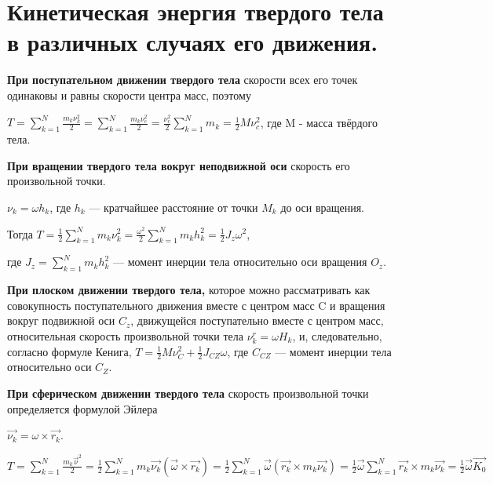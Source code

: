 {\section{Кинетическая энергия твердого тела в различных случаях его движения.}
\begin{center}
    \par \textbf{При поступательном движении твердого тела} скорости всех его точек одинаковы и равны скорости центра масс, поэтому 
    
    \par $T=\sum_{k=1}^{N}\frac{m_{k}\nu_{k}^{2}}{2} = \sum_{k=1}^{N}\frac{m_{k}\nu_{c}^{2}}{2} = \frac{\nu_{c}^{2}}{2}\sum_{k=1}^{N}m_{k} = \frac{1}{2}M\nu_{c}^{2}$, где M - масса твёрдого тела.
    
    \par \textbf {При  вращении  твердого  тела  вокруг  неподвижной  оси} скорость его произвольной точки. 
    
    \par $ \nu_{k} = \omega h_{k}$, где $ {h_{k}} $ — кратчайшее расстояние от точки $ {M_{k}} $ до оси вращения.
    
    \par Тогда $ T= \frac{1}{2}\sum_{k=1}^{N}{m_{k}\nu_{k}^{2}}= \frac{\omega^{2}}{2}\sum_{k=1}^{N}m_{k}h_{k}^{2} = \frac{1}{2}J_{z}\omega^{2} $, 
    \par где $J_{z} = \sum_{k=1}^{N}m_{k}h_{k}^{2}$ — момент инерции тела относительно оси вращения ${O_{z}}$.
   
    \par \textbf{При плоском движении твердого тела,} которое можно рассматривать как совокупность поступательного движения вместе с центром масс C и вращения  вокруг  подвижной  оси  ${C_{z}}$,  движущейся  поступательно  вместе  с центром масс, относительная скорость произвольной точки тела ${ \nu_{k}^{r} = \omega H_{k}}$, и, следовательно, согласно формуле Кенига,
    $T = \frac{1}{2}M\nu_{C}^{2} + \frac{1}{2}J_{CZ}\omega$, где ${C_{CZ}}$ — момент инерции тела относительно оси ${C_{Z}}$.

    \par \textbf {При сферическом движении твердого тела} скорость произвольной точки определяется формулой Эйлера
    \par $ \vec{\nu_{k}} = \omega \times\vec{r_{k}}. $
    
    \par $ T= \sum_{k=1}^{N} \frac{m_{k} \vec{\nu}^{2}}{2} = \frac{1}{2}\sum_{k=1}^{N}m_{k}\vec{\nu_{k}}(\vec{\omega} \times \vec{r_{k}}) = \frac{1}{2}\sum_{k=1}^{N}\vec{\omega}(\vec{r_{k}} \times m_{k}\vec{\nu_{k}} )=\frac{1}{2}\vec{\omega}\sum_{k=1}^{N} \vec{r_{k}} \times m_{k}\vec{\nu_{k}} =\frac{1}{2}\vec{\omega}\vec{K_{0}} $


\end{center}}
